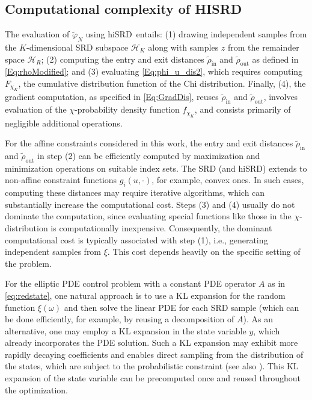 \documentclass[%
onefignum,onetabnum]{siamonline250211}
\newcommand{\hiSRD}{{\sc hiSRD}}
\begin{document}
\subsection{Computational complexity of {{\footnotesize HI}SRD}}
The evaluation of $\tilde\varphi_N$ using \hiSRD\ entails: (1) drawing independent samples from the $K$-dimensional SRD subspace $\mathscr H_K$ along with samples $z$ from the remainder space $\mathscr H_R$; (2) computing the entry and exit distances $\tilde\rho_\text{in}$ and $\tilde\rho_\text{out}$ as defined in \eqref{Eq:rhoModified}; and (3) evaluating \eqref{Eq:phi_u_dis2}, which requires computing $F_{\chi_K}$, the cumulative distribution function of the Chi distribution. Finally, (4), the gradient computation, as specified in \eqref{Eq:GradDis}, reuses $\tilde\rho_\text{in}$ and $\tilde\rho_\text{out}$, involves evaluation of the $\chi$-probability density function $f_{\chi_K}$, and consists primarily of negligible additional operations.

For the affine constraints considered in this work, the entry and exit distances $\tilde\rho_\text{in}$ and $\tilde\rho_\text{out}$ in step (2) can be efficiently computed by maximization and minimization operations on suitable index sets. The SRD (and \hiSRD) extends to non-affine constraint functions $g_i(u,\cdot)$, for example, convex ones. In such cases, computing these distances may require iterative algorithms, which can substantially increase the computational cost. Steps (3) and (4) usually do not dominate the computation, since evaluating special functions like those in the $\chi$-distribution is computationally inexpensive. Consequently, the dominant computational cost is typically associated with step (1), i.e., generating independent samples from $\xi$. This cost depends heavily on the specific setting of the problem.

For the elliptic PDE control problem with a constant PDE operator $A$ as in \eqref{eq:redstate}, one natural approach is to use a KL expansion for the random function $\xi(\omega)$ and then solve the linear PDE for each SRD sample (which can be done efficiently, for example, by reusing a decomposition of $A$). As an alternative, one may employ a KL expansion in the state variable $y$, which already incorporates the PDE solution. Such a KL expansion may exhibit more rapidly decaying coefficients and enables direct sampling from the distribution of the states, which are subject to the probabilistic constraint (see also \cite[Fig.~1]{HeStWe-SIAM25}). This KL expansion of the state variable can be precomputed once and reused throughout the optimization.
\end{document}
